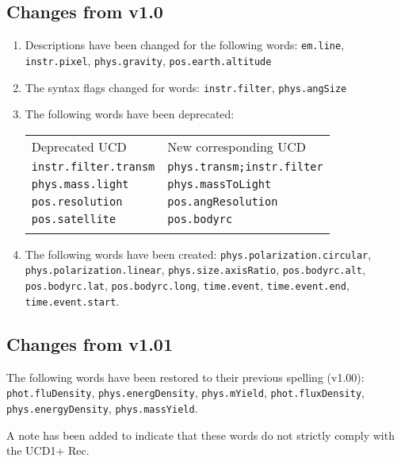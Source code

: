 \documentclass[11pt,a4paper]{ivoa}
\begin{document}
\subsection{Changes from v1.0}
\begin{enumerate}
\item Descriptions have been changed for the following words: {\tt em.line}, {\tt instr.pixel}, 
{\tt phys.gravity}, {\tt pos.earth.altitude}
\item The syntax flags changed for words: {\tt instr.filter}, {\tt phys.angSize}
\item The following words have been deprecated:

\begin{tabular}{|l|l|}
\sptablerule
Deprecated UCD & New corresponding UCD\\
\sptablerule
{\tt instr.filter.transm} & {\tt phys.transm;instr.filter}\\
{\tt phys.mass.light} & {\tt phys.massToLight}\\
{\tt pos.resolution} & {\tt pos.angResolution}\\
{\tt pos.satellite} & {\tt pos.bodyrc}\\
\sptablerule
\end{tabular}

\item The following words have been created: {\tt phys.polarization.circular}, 
{\tt phys.polarization.linear}, {\tt phys.size.axisRatio}, {\tt pos.bodyrc.alt}, 
{\tt pos.bodyrc.lat}, {\tt pos.bodyrc.long}, {\tt time.event}, {\tt time.event.end}, 
{\tt time.event.start}.
\end{enumerate}

\subsection{Changes from v1.01}

The following words have been restored to their previous spelling (v1.00): {\tt phot.fluDensity}, 
{\tt phys.energDensity}, {\tt phys.mYield}, {\tt phot.fluxDensity}, {\tt phys.energyDensity}, 
{\tt phys.massYield}.

A note has been added to indicate that these words do not strictly comply with the UCD1+ Rec.
\end{document}
